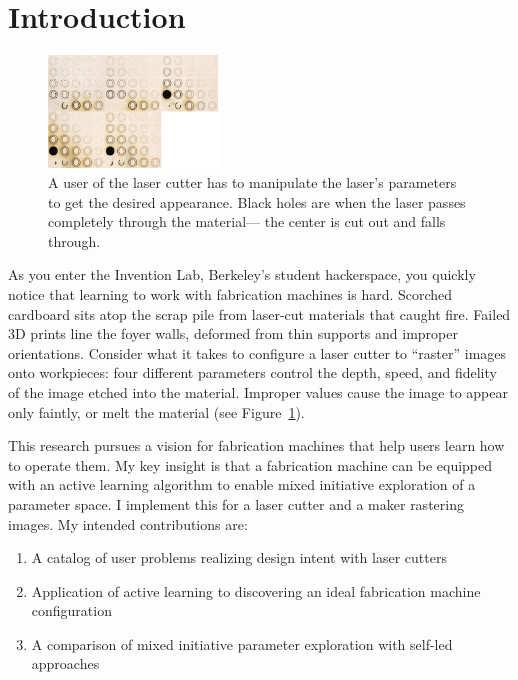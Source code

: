 \section{Introduction}

\begin{figure}
  \centering
  \includegraphics[width=0.4\textwidth]{figures/engravings}
  \caption{%
    A user of the laser cutter has to manipulate the laser's parameters to get the desired appearance.
    Black holes are when the laser passes completely through the material---
    the center is cut out and falls through.
  }\label{fig:rasters}
\end{figure}


As you enter the Invention Lab, Berkeley's student hackerspace, you quickly notice that learning to work with fabrication machines is hard.
Scorched cardboard sits atop the scrap pile from laser-cut materials that caught fire.
Failed 3D prints line the foyer walls, deformed from thin supports and improper orientations.
Consider what it takes to configure a laser cutter to ``raster'' images onto workpieces:
four different parameters control the depth, speed, and fidelity of the image etched into the material.
Improper values cause the image to appear only faintly, or melt the material (see Figure~\ref{fig:rasters}).

This research pursues a vision for fabrication machines that help users learn how to operate them.
My key insight is that a fabrication machine can be equipped with an active learning algorithm to enable mixed initiative exploration of a parameter space.
I implement this for a laser cutter and a maker rastering images.
My intended contributions are:
\begin{enumerate}
\item A catalog of user problems realizing design intent with laser cutters
\item Application of active learning to discovering an ideal fabrication machine configuration
\item A comparison of mixed initiative parameter exploration with self-led approaches
\end{enumerate}

